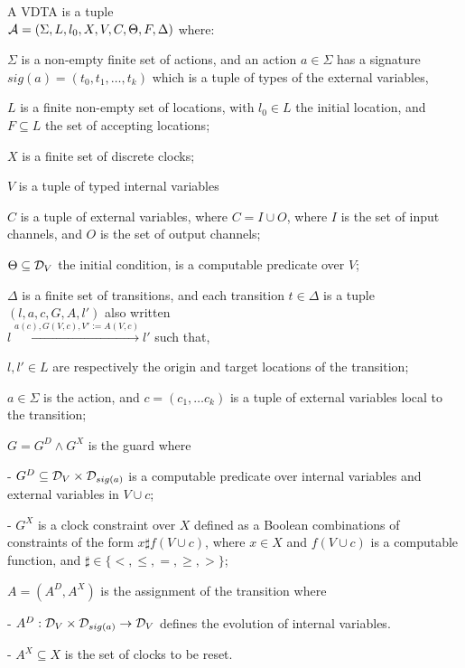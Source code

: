 %
\begin{definition}
	\label{def:ptav}
	A {VDTA} is a tuple \\
	${\mathcal A} = \left(\Sigma, L, {l_0}, X, V, C, \Theta, F,  \Delta \right)$ where:
	\squishlist
	\item $\Sigma$ is a non-empty finite set of actions,
	and an action $a \in \Sigma$ has a signature $sig(a) = ( t_0, t_1, \ldots, t_k )$ which is a tuple of types of the external variables,
	\item $L$ is a finite non-empty set of locations, with $l_0 \in L$ the initial location, and $F \subseteq L$ the set of accepting locations;
	\item $X$ is a finite set of discrete clocks;
	\item $V$ is a tuple of typed internal variables \item $C$ is a tuple of external variables, where $C = I \cup O$, where $I$ is the set of input channels, and $O$ is the set of output channels; 
	\item $\Theta\subseteq {\cal D}_{V }$ the initial condition, is a computable predicate over $V$;
	\item $\Delta$ is a finite set of transitions, and each transition $t \in \Delta$ is a tuple $( l, a, c, G, A, l' )$
	also written\\
	$l \xrightarrow{a(c), G(V,c), V':=A(V,c)} l'$
	such that,
	\squishlist
	\item[\textbullet] $l, l' \in L$ are respectively the origin and target locations of the transition;
	\item[\textbullet] $a \in \Sigma$ is the action, and $c=( c_1, \ldots c_k )$ is a tuple of external variables local to the transition;
	\item[\textbullet] $G = G^D \wedge G^X$ is the guard where
	\squishlist
	\item[-] $G^D \subseteq {\cal D}_V \times {\cal D}_{sig(a)}$
	is a computable predicate over internal variables and external variables  in $V \cup c$;
	\item[-] $G^X$ is a clock constraint over $X$ defined as a Boolean combinations of constraints of the form $x \sharp f(V \cup c)$, where $x \in X$ and $f(V \cup c)$ is a computable function, and $\sharp \in \{ <, \leq, =, \geq, > \}$;
	\squishend
	\item[\textbullet] $A$$=$$(A^D, A^X)$ is the assignment of the transition where
	\squishlist
	\item[-] $A^D :{\cal D}_V \times {\cal D}_{sig(a)} \rightarrow {\cal D}_V$ defines the evolution of internal variables.
	\item[-] $A^X \subseteq X$ is the set of clocks to be reset.
	\squishend
	\squishend
	\squishend
\end{definition}
%

